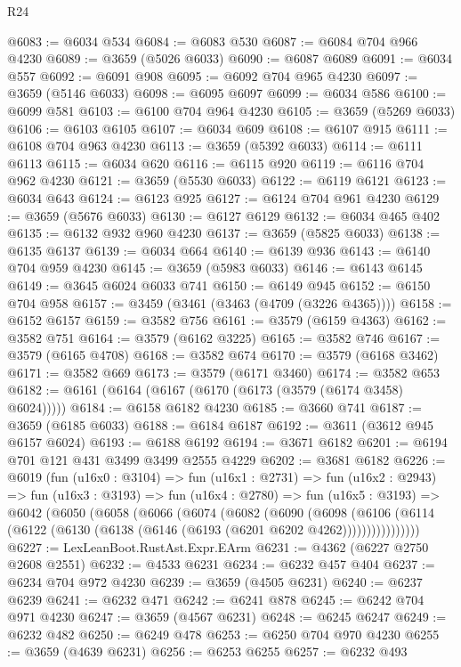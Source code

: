 \begin{lexlean}{R24}
\begin{coremodule}
@6083 := @6034 @534
@6084 := @6083 @530
@6087 := @6084 @704 @966 @4230
@6089 := @3659 (@5026 @6033)
@6090 := @6087 @6089
@6091 := @6034 @557
@6092 := @6091 @908
@6095 := @6092 @704 @965 @4230
@6097 := @3659 (@5146 @6033)
@6098 := @6095 @6097
@6099 := @6034 @586
@6100 := @6099 @581
@6103 := @6100 @704 @964 @4230
@6105 := @3659 (@5269 @6033)
@6106 := @6103 @6105
@6107 := @6034 @609
@6108 := @6107 @915
@6111 := @6108 @704 @963 @4230
@6113 := @3659 (@5392 @6033)
@6114 := @6111 @6113
@6115 := @6034 @620
@6116 := @6115 @920
@6119 := @6116 @704 @962 @4230
@6121 := @3659 (@5530 @6033)
@6122 := @6119 @6121
@6123 := @6034 @643
@6124 := @6123 @925
@6127 := @6124 @704 @961 @4230
@6129 := @3659 (@5676 @6033)
@6130 := @6127 @6129
@6132 := @6034 @465 @402
@6135 := @6132 @932 @960 @4230
@6137 := @3659 (@5825 @6033)
@6138 := @6135 @6137
@6139 := @6034 @664
@6140 := @6139 @936
@6143 := @6140 @704 @959 @4230
@6145 := @3659 (@5983 @6033)
@6146 := @6143 @6145
@6149 := @3645 @6024 @6033 @741
@6150 := @6149 @945
@6152 := @6150 @704 @958
@6157 := @3459 (@3461 (@3463 (@4709 (@3226 @4365))))
@6158 := @6152 @6157
@6159 := @3582 @756
@6161 := @3579 (@6159 @4363)
@6162 := @3582 @751
@6164 := @3579 (@6162 @3225)
@6165 := @3582 @746
@6167 := @3579 (@6165 @4708)
@6168 := @3582 @674
@6170 := @3579 (@6168 @3462)
@6171 := @3582 @669
@6173 := @3579 (@6171 @3460)
@6174 := @3582 @653
@6182 := @6161 (@6164 (@6167 (@6170 (@6173 (@3579 (@6174 @3458) @6024)))))
@6184 := @6158 @6182 @4230
@6185 := @3660 @741
@6187 := @3659 (@6185 @6033)
@6188 := @6184 @6187
@6192 := @3611 (@3612 @945 @6157 @6024)
@6193 := @6188 @6192
@6194 := @3671 @6182
@6201 := @6194 @701 @121 @431 @3499 @3499 @2555 @4229
@6202 := @3681 @6182
@6226 := @6019
    (fun (u16x0 : @3104) =>
    fun (u16x1 : @2731) =>
    fun (u16x2 : @2943) =>
    fun (u16x3 : @3193) =>
    fun (u16x4 : @2780) =>
    fun (u16x5 : @3193) =>
    @6042
      (@6050
        (@6058
          (@6066
            (@6074
              (@6082
                (@6090
                  (@6098
                    (@6106
                      (@6114 (@6122 (@6130 (@6138 (@6146 (@6193 (@6201 @6202 @4262))))))))))))))))
@6227 := LexLeanBoot.RustAst.Expr.EArm
@6231 := @4362 (@6227 @2750 @2608 @2551)
@6232 := @4533 @6231
@6234 := @6232 @457 @404
@6237 := @6234 @704 @972 @4230
@6239 := @3659 (@4505 @6231)
@6240 := @6237 @6239
@6241 := @6232 @471
@6242 := @6241 @878
@6245 := @6242 @704 @971 @4230
@6247 := @3659 (@4567 @6231)
@6248 := @6245 @6247
@6249 := @6232 @482
@6250 := @6249 @478
@6253 := @6250 @704 @970 @4230
@6255 := @3659 (@4639 @6231)
@6256 := @6253 @6255
@6257 := @6232 @493

\end{coremodule}
\end{lexlean}

